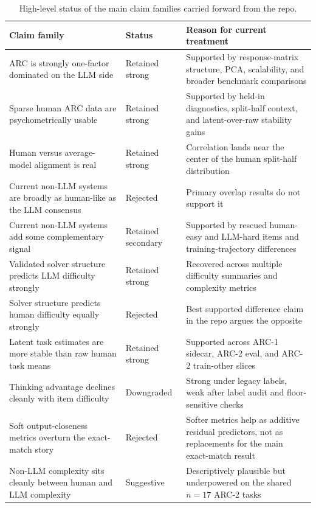 \begin{table}[t]
\centering
\small
\caption{High-level status of the main claim families carried forward from the repo.}
\begin{tabular}{p{2.0in}p{1.0in}p{2.8in}}
\toprule
\textbf{Claim family} & \textbf{Status} & \textbf{Reason for current treatment} \\
\midrule
ARC is strongly one-factor dominated on the LLM side & Retained strong & Supported by response-matrix structure, PCA, scalability, and broader benchmark comparisons \\
Sparse human ARC data are psychometrically usable & Retained strong & Supported by held-in diagnostics, split-half context, and latent-over-raw stability gains \\
Human versus average-model alignment is real & Retained strong & Correlation lands near the center of the human split-half distribution \\
Current non-LLM systems are broadly as human-like as the LLM consensus & Rejected & Primary overlap results do not support it \\
Current non-LLM systems add some complementary signal & Retained secondary & Supported by rescued human-easy and LLM-hard items and training-trajectory differences \\
Validated solver structure predicts LLM difficulty strongly & Retained strong & Recovered across multiple difficulty summaries and complexity metrics \\
Solver structure predicts human difficulty equally strongly & Rejected & Best supported difference claim in the repo argues the opposite \\
Latent task estimates are more stable than raw human task means & Retained strong & Supported across ARC-1 sidecar, ARC-2 eval, and ARC-2 train-other slices \\
Thinking advantage declines cleanly with item difficulty & Downgraded & Strong under legacy labels, weak after label audit and floor-sensitive checks \\
Soft output-closeness metrics overturn the exact-match story & Rejected & Softer metrics help as additive residual predictors, not as replacements for the main exact-match result \\
Non-LLM complexity sits cleanly between human and LLM complexity & Suggestive & Descriptively plausible but underpowered on the shared $n = 17$ ARC-2 tasks \\
\bottomrule
\end{tabular}
\end{table}

